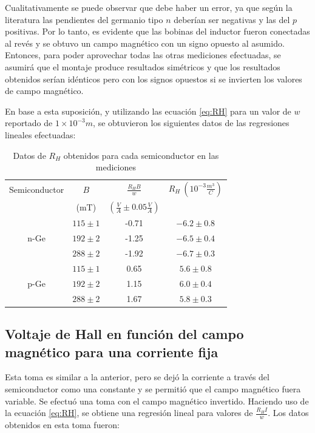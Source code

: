 \documentclass[twocolumn,showkeys,preprintnumbers,amsmath,amssymb]{revtex4}
\begin{document}
\begin{widetext}
		\end{widetext}
		
		Cualitativamente se puede observar que debe haber un error, ya que según la literatura las pendientes del germanio tipo $n$ deberían ser negativas y las del $p$ positivas. Por lo tanto, es evidente que las bobinas del inductor fueron conectadas al revés y se obtuvo un campo magnético con un signo opuesto al asumido. Entonces, para poder aprovechar todas las otras mediciones efectuadas, se asumirá que el montaje produce resultados simétricos y que los resultados obtenidos serían idénticos pero con los signos opuestos si se invierten los valores de campo magnético.
		
		En base a esta suposición, y utilizando las ecuación \eqref{eq:RH} para un valor de $w$ reportado de $1\times 10^{-3}m$\cite{bib:guia}, se obtuvieron los siguientes datos de las regresiones lineales efectuadas:
		
		\begin{table}[H]
			\centering
			\begin{tabular}{ c | c | c | c }
				Semiconductor & $B$ & $\frac{R_H B}{w}$ & $R_H \ \left( 10^{-3}\frac{m^3}{C} \right)$ \\
				& (mT) & $\left(\frac{V}{A} \pm 0.05 \frac{V}{A} \right)$ & \\ \hline
				\multirow{3}{*}{n-Ge} & $115 \pm 1$ & -0.71 & $-6.2\pm 0.8$ \\
				 & $192 \pm 2$ & -1.25 & $-6.5\pm 0.4$ \\
				 & $288 \pm 2$ & -1.92 & $-6.7\pm 0.3$ \\ \hline
				\multirow{3}{*}{p-Ge} & $115 \pm 1$ & 0.65 & $5.6\pm 0.8$ \\
				 & $192 \pm 2$ & 1.15 & $6.0\pm 0.4$ \\
				 & $288 \pm 2$ & 1.67 & $5.8\pm 0.3$ \\
			\end{tabular}
			\caption{Datos de $R_H$ obtenidos para cada semiconductor en las mediciones}
			\label{tab:RH-BConst}
		\end{table}
		
	\subsection{Voltaje de Hall en función del campo magnético para una corriente fija}
		
		Esta toma es similar a la anterior, pero se dejó la corriente a través del semiconductor como una constante y se permitió que el campo magnético fuera variable. Se efectuó una toma con el campo magnético invertido. Haciendo uso de la ecuación \eqref{eq:RH}, se obtiene una regresión lineal para valores de $\frac{R_H I}{w}$. Los datos obtenidos en esta toma fueron:
		
\end{document}
